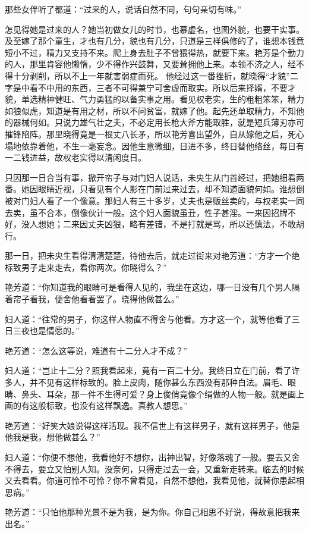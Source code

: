 \documentclass[a4paper,12pt,UTF8,twoside]{ctexbook}
\begin{document}
那些女伴听了都道：“过来的人，说话自然不同，句句亲切有味。”

怎见得她是过来的人？她当初做女儿的时节，也慕虚名，也图外貌，也要干实事。及至嫁了那个童生，才也有几分，貌也有几分，只道是三样俱修的了，谁想本钱竟短小不过，精力又支持不来。爬上身去肚子不曾猥得热，就要下来。艳芳是个勤力的人，那里肯容他懒惰，少不得作兴鼓舞，又要耸拥他上来。本领不济之人，经不得十分剥削，所以不上一年就害弱症而死。 他经过这一番挫折，就晓得“才貌”二字是中看不中用的东西，三者不可得兼宁可舍虚而取实。所以后来择婿，不要才貌，单选精神健旺、气力勇猛的以备实事之用。看见权老实，生的粗粗笨笨，精力如狼似虎，知道是有用之材，所以不问贫富，就嫁了他。起先还单取精力，不知他的器械何如。只说力雄气壮之夫，不必定用长枪大斧方能取胜，就是短兵薄刃亦可摧锋陷阵。那里晓得竟是一根丈八长矛，所以艳芳喜出望外，自从嫁他之后，死心塌地依靠着他，不生一毫妄念。因他生意微细，日进不多，终日替他络丝，每日有一二钱进益，故权老实得以清闲度日。

只因那一日合当有事，掀开帘子与对门妇人说话，未央生从门首经过，把她细看两番。她因眼睛近视，只看见有个人影在门前过来过去，却不知道面貌何如。谁想倒被对门妇人看了一个像意。那妇人有三十多岁，丈夫也是贩丝卖的，与权老实一同去卖，虽不合本，倒像伙计一般。这个妇人面貌虽丑，性子甚淫。一来因招牌不好，没人想她；二来因丈夫凶狠，略有差错，不是打就是骂，所以还慎法，不敢胡行。

那一日，把未央生看得清清楚楚，待他去后，就走过街来对艳芳道：“方才一个绝标致男子走来走去，看你两次。你晓得么？”

艳芳道：“你知道我的眼睛可是看得人见的，我坐在这边，哪一日没有几个男人隔着帘子看我，便舍他看看罢了。晓得他做甚么。”

妇人道：“往常的男子，你这样人物直不得舍与他看。方才这一个，就等他看了三日三夜也是情愿的。”

艳芳道：“怎么这等说，难道有十二分人才不成？”

妇人道：“岂止十二分？照我看起来，竟有一百二十分。我终日立在门前，看了许多人，并不见有这样标致的。脸上皮肉，随你甚么东西没有那种白法。眉毛、眼睛、鼻头、耳朵，那一件不生得可爱？身上俊俏竟像个绢做的人物一般。就是画上画的有这般标致，也没有这样飘逸。真教人想思。”

艳芳道：“好笑大娘说得这样活现。我不信世上有这样男子，就有这样男子，他是他我是我，想他做甚么？”

妇人道：“你便不想他，我看他好不想你，出神出智，好像落魂了一般。要去又舍不得去，要立又怕别人知。没奈何，只得走过去一会，又重新走转来。临去的时候又去看看。你道可怜不可怜？你不曾看见，自然不想他，我看见他，就替你患起相思病。”

艳芳道：“只怕他那种光景不是为我，是为你。你自己相思不好说，得故意把我来出名。”
\end{document}
